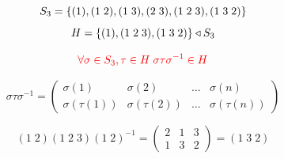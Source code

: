\begin{frame}
  \begin{exampleblock}{}
    \[
      S_{3} = \{(1), (1\; 2), (1\; 3), (2\; 3), (1\; 2\; 3), (1\; 3\; 2)\}
    \]
    \[
      H = \{(1), (1\; 2\; 3), (1\; 3\; 2)\} \triangleleft S_{3}
    \]
  \end{exampleblock}

  \pause
  \[
    \textcolor{red}{\forall \sigma \in S_{3}, \tau \in H\; \sigma \tau \sigma^{-1} \in H}
  \]

  \pause
  \begin{theorem}
    \[
      \sigma \tau \sigma^{-1} = \begin{pmatrix}
        \sigma(1) & \sigma(2) & \dots & \sigma(n) \\
        \sigma(\tau(1)) & \sigma(\tau(2)) & \dots & \sigma(\tau(n))
      \end{pmatrix}
    \]
  \end{theorem}

  \pause
  \[
    (1\;2) (1\;2\;3) (1\;2)^{-1} = \begin{pmatrix}
      2 & 1 & 3 \\
      1 & 3 & 2
    \end{pmatrix} = (1\; 3\; 2)
  \]
\end{frame}
